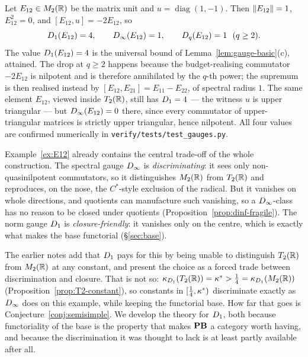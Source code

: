 \begin{example}\label{ex:E12}
Let $E_{12}\in M_2(\mathbb{R})$ be the matrix unit and $u=\operatorname{diag}(1,-1)$.
Then $\left\lVert E_{12}\right\rVert=1$, $E_{12}^2=0$, and
$[E_{12},u]=-2E_{12}$, so
\[
  D_1(E_{12})=4,\qquad D_\infty(E_{12})=1,\qquad
  D_q(E_{12})=1\ \ (q\ge2).
\]
The value $D_1(E_{12})=4$ is the universal bound of
Lemma~\ref{lem:gauge-basic}(c), attained.  The drop at $q\ge2$ happens because
the budget-realising commutator $-2E_{12}$ is nilpotent and is therefore
annihilated by the $q$-th power; the supremum is then realised instead by
$[E_{12},E_{21}]=E_{11}-E_{22}$, of spectral radius $1$.  The same element
$E_{12}$, viewed inside $T_2(\mathbb{R})$, still has $D_1=4$ --- the witness $u$
is upper triangular --- but $D_\infty(E_{12})=0$ there, since every
commutator of upper-triangular matrices is strictly upper triangular, hence
nilpotent.  All four values are confirmed numerically in
\texttt{verify/tests/test\_gauges.py}.
\end{example}

\begin{remark}
\label{rem:gauge-tradeoff}
Example~\ref{ex:E12} already contains the central trade-off of the whole
construction.  The spectral gauge $D_\infty$ is \emph{discriminating}: it
sees only non-quasinilpotent commutators, so it distinguishes $M_2(\mathbb{R})$ from
$T_2(\mathbb{R})$ and reproduces, on the nose, the $C^*$-style exclusion of the
radical.  But it vanishes on whole directions, and quotients can manufacture
such vanishing, so a $D_\infty$-class has no reason to be closed under
quotients (Proposition~\ref{prop:dinf-fragile}).  The norm gauge $D_1$ is
\emph{closure-friendly}: it vanishes only on the centre, which is exactly what
makes the base functorial (\S\ref{sec:base}).

The earlier notes add that $D_1$ pays for this by being unable to
distinguish $T_2(\mathbb{R})$ from $M_2(\mathbb{R})$ at any constant, and present the choice
as a forced trade between discrimination and closure.  That is not so:
$\kappa_{D_1}(T_2(\mathbb{R}))=\kappa^*>\tfrac14=\kappa_{D_1}(M_2(\mathbb{R}))$
(Proposition~\ref{prop:T2-constant}), so constants in $[\tfrac14,\kappa^*)$
discriminate exactly as $D_\infty$ does on this example, while keeping the
functorial base.  How far that goes is
Conjecture~\ref{conj:semisimple}.  We develop the theory for $D_1$, both
because functoriality of the base is the property that makes $\mathbf{PB}$ a category
worth having, and because the discrimination it was thought to lack is at least
partly available after all.
\end{remark}

